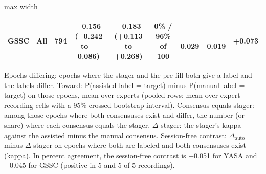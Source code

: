 \begin{table}[h!]
\begin{adjustbox}{max width=\linewidth}
\begin{tabular}{llccccccc}
GSSC & All & 794 & \ensuremath{-}0.156 (\ensuremath{-}0.242 to \ensuremath{-}0.086) & +0.183 (+0.113 to +0.268) & 0\% / 96\% of 100 & \ensuremath{-}0.029 & \ensuremath{-}0.019 & +0.073 \\
\bottomrule
\end{tabular}
\end{adjustbox}
\par\smallskip
\begin{minipage}{0.95\linewidth}\footnotesize Epochs differing: epochs where the stager and the pre-fill both give a label and the labels differ. Toward: P(assisted label = target) minus P(manual label = target) on those epochs, mean over experts (pooled rows: mean over expert-recording cells with a 95\% crossed-bootstrap interval). Consensus equals stager: among those epochs where both consensuses exist and differ, the number (or share) where each consensus equals the stager. $\Delta$ stager: the stager's kappa against the assisted minus the manual consensus. Session-free contrast: $\Delta_{\mathrm{auto}}$ minus $\Delta$ stager on epochs where both are labeled and both consensuses exist (kappa). In percent agreement, the session-free contrast is +0.051 for YASA and +0.045 for GSSC (positive in 5 and 5 of 5 recordings).\end{minipage}
\end{table}
